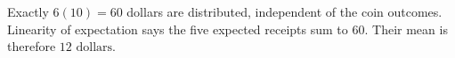 Exactly $ 6(10)=60 $ dollars are distributed, independent of the coin outcomes. Linearity of expectation says the five expected receipts sum to $ 60 $. Their mean is therefore $\boxed{12\text{ dollars}}$.
